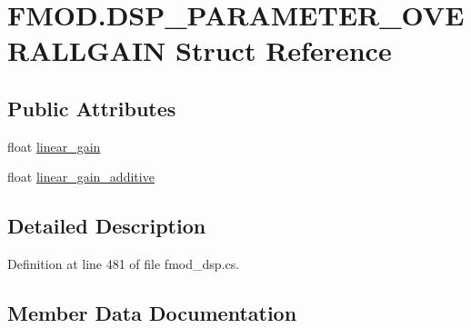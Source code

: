 \hypertarget{struct_f_m_o_d_1_1_d_s_p___p_a_r_a_m_e_t_e_r___o_v_e_r_a_l_l_g_a_i_n}{}\section{F\+M\+O\+D.\+D\+S\+P\+\_\+\+P\+A\+R\+A\+M\+E\+T\+E\+R\+\_\+\+O\+V\+E\+R\+A\+L\+L\+G\+A\+IN Struct Reference}
\label{struct_f_m_o_d_1_1_d_s_p___p_a_r_a_m_e_t_e_r___o_v_e_r_a_l_l_g_a_i_n}
\subsection*{Public Attributes}
\begin{DoxyCompactItemize}
\item 
float \hyperlink{struct_f_m_o_d_1_1_d_s_p___p_a_r_a_m_e_t_e_r___o_v_e_r_a_l_l_g_a_i_n_af7474d2ca5eb908020c3b1b3ebb5b931}{linear\+\_\+gain}
\item 
float \hyperlink{struct_f_m_o_d_1_1_d_s_p___p_a_r_a_m_e_t_e_r___o_v_e_r_a_l_l_g_a_i_n_a49f0014438b4c4a9f33d063dd326782e}{linear\+\_\+gain\+\_\+additive}
\end{DoxyCompactItemize}


\subsection{Detailed Description}


Definition at line 481 of file fmod\+\_\+dsp.\+cs.



\subsection{Member Data Documentation}
\mbox{\label{struct_f_m_o_d_1_1_d_s_p___p_a_r_a_m_e_t_e_r___o_v_e_r_a_l_l_g_a_i_n_af7474d2ca5eb908020c3b1b3ebb5b931}} 
